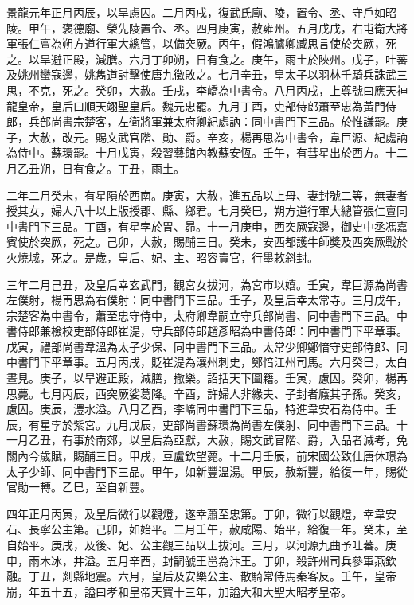 \begin{pinyinscope}
 景龍元年正月丙辰，以旱慮囚。二月丙戌，復武氏廟、陵，置令、丞、守戶如昭陵。甲午，褒德廟、榮先陵置令、丞。四月庚寅，赦雍州。五月戊戌，右屯衛大將軍張仁亶為朔方道行軍大總管，以備突厥。丙午，假鴻臚卿臧思言使於突厥，死之。以旱避正殿，減膳。六月丁卯朔，日有食之。庚午，雨土於陜州。戊子，吐蕃及姚州蠻寇邊，姚雋道討擊使唐九徵敗之。七月辛丑，皇太子以羽林千騎兵誅武三思，不克，死之。癸卯，大赦。壬戌，李嶠為中書令。八月丙戌，上尊號曰應天神龍皇帝，皇后曰順天翊聖皇后。魏元忠罷。九月丁酉，吏部侍郎蕭至忠為黃門侍郎，兵部尚書宗楚客，左衛將軍兼太府卿紀處訥：同中書門下三品。於惟謙罷。庚子，大赦，改元。賜文武官階、勛、爵。辛亥，楊再思為中書令，韋巨源、紀處訥為侍中。蘇環罷。十月戊寅，殺習藝館內教蘇安恆。壬午，有彗星出於西方。十二月乙丑朔，日有食之。丁丑，雨土。



 二年二月癸未，有星隕於西南。庚寅，大赦，進五品以上母、妻封號二等，無妻者授其女，婦人八十以上版授郡、縣、鄉君。七月癸巳，朔方道行軍大總管張仁亶同中書門下三品。丁酉，有星孛於胃、昴。十一月庚申，西突厥寇邊，御史中丞馮嘉賓使於突厥，死之。己卯，大赦，賜酺三日。癸未，安西都護牛師獎及西突厥戰於火燒城，死之。是歲，皇后、妃、主、昭容賣官，行墨敕斜封。



 三年二月己丑，及皇后幸玄武門，觀宮女拔河，為宮市以嬉。壬寅，韋巨源為尚書左僕射，楊再思為右僕射：同中書門下三品。壬子，及皇后幸太常寺。三月戊午，宗楚客為中書令，蕭至忠守侍中，太府卿韋嗣立守兵部尚書、同中書門下三品。中書侍郎兼檢校吏部侍郎崔湜，守兵部侍郎趙彥昭為中書侍郎：同中書門下平章事。戊寅，禮部尚書韋溫為太子少保、同中書門下三品。太常少卿鄭愔守吏部侍郎、同中書門下平章事。五月丙戌，貶崔湜為瀼州刺史，鄭愔江州司馬。六月癸巳，太白晝見。庚子，以旱避正殿，減膳，撤樂。詔括天下圖籍。壬寅，慮囚。癸卯，楊再思薨。七月丙辰，西突厥娑葛降。辛酉，許婦人非緣夫、子封者廕其子孫。癸亥，慮囚。庚辰，澧水溢。八月乙酉，李嶠同中書門下三品，特進韋安石為侍中。壬辰，有星孛於紫宮。九月戊辰，吏部尚書蘇環為尚書左僕射、同中書門下三品。十一月乙丑，有事於南郊，以皇后為亞獻，大赦，賜文武官階、爵，入品者減考，免關內今歲賦，賜酺三日。甲戌，豆盧欽望薨。十二月壬辰，前宋國公致仕唐休璟為太子少師、同中書門下三品。甲午，如新豐溫湯。甲辰，赦新豐，給復一年，賜從官勛一轉。乙巳，至自新豐。



 四年正月丙寅，及皇后微行以觀燈，遂幸蕭至忠第。丁卯，微行以觀燈，幸韋安石、長寧公主第。己卯，如始平。二月壬午，赦咸陽、始平，給復一年。癸未，至自始平。庚戌，及後、妃、公主觀三品以上拔河。三月，以河源九曲予吐蕃。庚申，雨木冰，井溢。五月辛酉，封嗣虢王邕為汴王。丁卯，殺許州司兵參軍燕欽融。丁丑，剡縣地震。六月，皇后及安樂公主、散騎常侍馬秦客反。壬午，皇帝崩，年五十五，謚曰孝和皇帝天寶十三年，加謚大和大聖大昭孝皇帝。




\end{pinyinscope}

